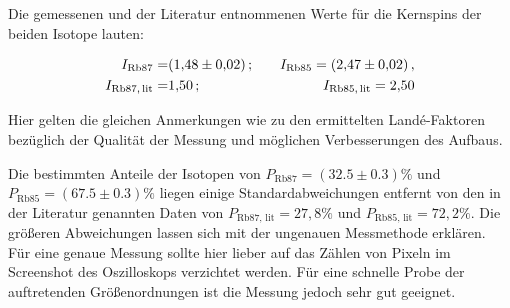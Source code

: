 Die gemessenen und der Literatur entnommenen \cite{Rb} Werte für die Kernspins der beiden Isotope lauten:

\begin{eqnarray}
I_{\text{Rb}87} =& \SI{1.48 \pm 0.02}; \quad &I_{\text{Rb}85} = \SI{2.47 \pm 0.02},\\
I_{\text{Rb}87, \,\text{lit}} =& \SI{1.50}; \quad &I_{\text{Rb}85, \,\text{lit}} = \SI{2.50}.
\end{eqnarray}

Hier gelten die gleichen Anmerkungen wie zu den ermittelten Landé-Faktoren bezüglich der Qualität der Messung und möglichen Verbesserungen des Aufbaus.

Die bestimmten Anteile der Isotopen von $P_{\text{Rb}87} = (32.5 \pm 0.3)\%$ und $P_{\text{Rb}85} = (67.5 \pm 0.3) \%$ liegen einige Standardabweichungen entfernt von den in der Literatur \cite{Rb} genannten Daten von $P_{\text{Rb}87, \, \text{lit}} = 27,8\%$ und $P_{\text{Rb}85, \, \text{lit}} = 72,2 \%$. Die größeren Abweichungen lassen sich mit der ungenauen Messmethode erklären. Für eine genaue Messung sollte hier lieber auf das Zählen von Pixeln im Screenshot des Oszilloskops verzichtet werden. Für eine schnelle Probe der auftretenden Größenordnungen ist die Messung jedoch sehr gut geeignet.